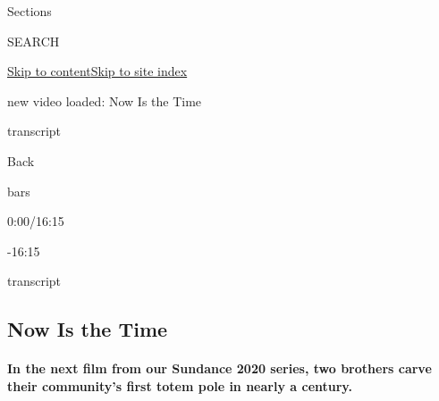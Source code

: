 Sections

SEARCH

\protect\hyperlink{site-content}{Skip to
content}\protect\hyperlink{site-index}{Skip to site index}

new video loaded: Now Is the Time

transcript

Back

bars

0:00/16:15

-16:15

transcript

\hypertarget{now-is-the-time}{%
\subsection{Now Is the Time}\label{now-is-the-time}}

\hypertarget{in-the-next-film-from-our-sundance-2020-series-two-brothers-carve-their-communitys-first-totem-pole-in-nearly-a-century}{%
\paragraph{In the next film from our Sundance 2020 series, two brothers
carve their community's first totem pole in nearly a
century.}\label{in-the-next-film-from-our-sundance-2020-series-two-brothers-carve-their-communitys-first-totem-pole-in-nearly-a-century}}

